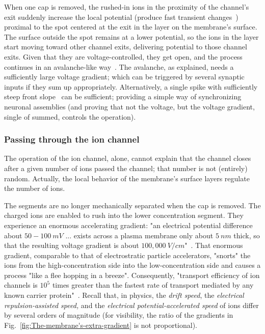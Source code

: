 When one cap is removed, the rushed-in
ions in the proximity of the channel's exit suddenly increase the
local potential (produce fast transient changes~\cite{KochElectricalPropertiesSpike:1983})
proximal to the spot centered at the exit in the layer on the membrane's surface.
The surface outside the spot remains at a lower potential, so the
ions in the layer start moving toward other channel exits, delivering
potential to those channel exits. Given that they are voltage-controlled,
they get open, and the process continues in an avalanche-like way~\cite{NeuronalAvalanches:2003}. The avalanche, as explained, needs a 
sufficiently large voltage gradient; which can be triggered by several
synaptic inputs if they sum up appropriately. Alternatively, a single spike with sufficiently steep front slope~\cite{LosonczyIntegrative:2006}
can be sufficient; providing a simple way of synchronizing neuronal assemblies
(and proving that not the voltage, but the voltage gradient, single of summed, controls the operation).


\subsubsection[Ions' passing]{Passing through the ion channel\label{sec:Electrodiffusion_PassingIonChannel}}

The operation of the ion channel, alone, cannot explain that
the channel closes after a given number of ions passed the channel;
that number is not (entirely) random. Actually, the local behavior of the membrane's
surface layers regulate the number of ions. 

The segments are no longer mechanically separated when the cap is
removed. The charged ions are enabled to rush into the lower concentration
segment. They experience an enormous accelerating gradient: "an
electrical potential difference about $50-100\ mV$ ... exists across
a plasma membrane only about $5\ nm$ thick, so that the resulting
voltage gradient is about $100,000\ V/cm$"~\cite{MolecularBiology:2002}.
That enormous gradient, comparable to that of electrostratic particle
accelerators, "snorts" the ions from the high-concentration side
into the low-concentration side and causes a process "like
a flee hopping in a breeze". 
Consequently, "transport efficiency of ion channels
is $10^5$ times greater than the fastest rate of transport mediated
by any known carrier protein"~\cite{MolecularBiology:2002}. 
Recall that, in physics,
the \emph{drift speed}, the \emph{electrical repulsion-assisted speed,
}and the \emph{electrical potential-accelerated speed} of ions differ
by several orders of magnitude (for visibility, the ratio of the gradients
in Fig.~\ref{fig:The-membrane's-extra-gradient} is not proportional).

